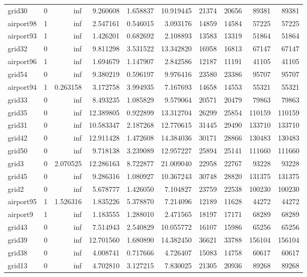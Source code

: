 \begin{longtable}{|l|r|r|r|r|r|r|r|r|r|}
grid30 & 0 & inf & 9.260608 & 1.658837 & 10.919445 & 21374 & 20656 & 89381 & 89381 \\
airport98 & 1 & inf & 2.547161 & 0.546015 & 3.093176 & 14859 & 14584 & 57225 & 57225 \\
airport93 & 1 & inf & 1.426201 & 0.682692 & 2.108893 & 13583 & 13319 & 51864 & 51864 \\
grid32 & 0 & inf & 9.811298 & 3.531522 & 13.342820 & 16958 & 16813 & 67147 & 67147 \\
airport96 & 1 & inf & 1.694679 & 1.147907 & 2.842586 & 12187 & 11191 & 41105 & 41105 \\
grid54 & 0 & inf & 9.380219 & 0.596197 & 9.976416 & 23580 & 23386 & 95707 & 95707 \\
airport94 & 1 & 0.263158 & 3.172758 & 3.994935 & 7.167693 & 14658 & 14553 & 55321 & 55321 \\
grid33 & 0 & inf & 8.493235 & 1.085829 & 9.579064 & 20571 & 20479 & 79863 & 79863 \\
grid35 & 0 & inf & 12.389805 & 0.922899 & 13.312704 & 26299 & 25854 & 110159 & 110159 \\
grid31 & 0 & inf & 10.583347 & 2.187268 & 12.770615 & 31445 & 29490 & 133710 & 133710 \\
grid42 & 0 & inf & 12.911428 & 1.472608 & 14.384036 & 30171 & 28866 & 130483 & 130483 \\
grid50 & 0 & inf & 9.718138 & 3.239089 & 12.957227 & 25894 & 25141 & 111660 & 111660 \\
grid3 & 0 & 2.070525 & 12.286163 & 8.722877 & 21.009040 & 22958 & 22767 & 93228 & 93228 \\
grid45 & 0 & inf & 9.286316 & 1.080927 & 10.367243 & 30748 & 28820 & 131375 & 131375 \\
grid2 & 0 & inf & 5.678777 & 1.426050 & 7.104827 & 23759 & 22538 & 100230 & 100230 \\
airport95 & 1 & 1.526316 & 1.835226 & 5.378870 & 7.214096 & 12189 & 11628 & 44272 & 44272 \\
airport9 & 1 & inf & 1.183555 & 1.288010 & 2.471565 & 18197 & 17171 & 68289 & 68289 \\
grid43 & 0 & inf & 7.514943 & 2.540829 & 10.055772 & 16107 & 15986 & 65256 & 65256 \\
grid39 & 0 & inf & 12.701560 & 1.680890 & 14.382450 & 36621 & 33788 & 156104 & 156104 \\
grid38 & 0 & inf & 4.008741 & 0.717666 & 4.726407 & 15083 & 14758 & 60617 & 60617 \\
grid13 & 0 & inf & 4.702810 & 3.127215 & 7.830025 & 21305 & 20936 & 89268 & 89268 \\

\end{longtable}
